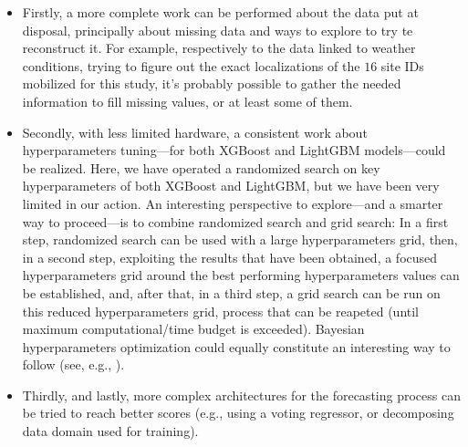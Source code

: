 \documentclass[twocolumn, switch]{article}
\begin{document}
\begin{itemize}
\item Firstly, a more complete work can be performed about the data put at disposal, principally about missing data and ways to explore to try te reconstruct it. For example, respectively to the data linked to weather conditions, trying to figure out the exact localizations of the $16$ site IDs mobilized for this study, it's probably possible to gather the needed information to fill missing values, or at least some of them.
\item Secondly, with less limited hardware, a consistent work about hyperparameters tuning---for both XGBoost and LightGBM models---could be realized. Here, we have operated a randomized search on key hyperparameters of both XGBoost and LightGBM, but we have been very limited in our action. An interesting perspective to explore---and a smarter way to proceed---is to combine randomized search and grid search: In a first step, randomized search can be used with a large hyperparameters grid, then, in a second step, exploiting the results that have been obtained, a focused hyperparameters grid around the best performing hyperparameters values can be established, and, after that, in a third step, a grid search can be run on this reduced hyperparameters grid, process that can be reapeted (until maximum computational/time budget is exceeded). Bayesian hyperparameters optimization could equally constitute an interesting way to follow (see, e.g., \cite{Bergstra_2013}).
\item Thirdly, and lastly, more complex architectures for the forecasting process can be tried to reach better scores (e.g., using a voting regressor, or decomposing data domain used for training).
\end{itemize}



\begin{normalsize}

\end{normalsize}


\end{document}
